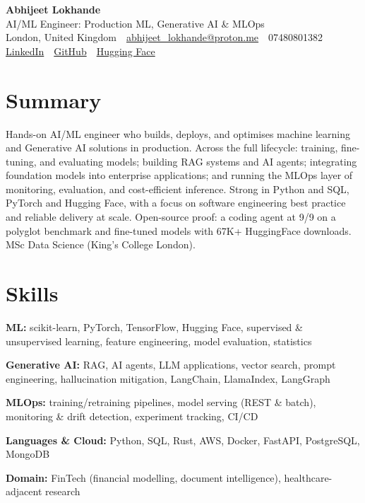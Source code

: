 \documentclass[10pt,a4paper]{article}
\newcommand{\sep}{\,\textcolor{accent!60}{\textbar}\,}
\begin{document}
\begin{center}
  {\fontsize{24}{26}\selectfont\bfseries Abhijeet Lokhande}\\[3pt]
  {\color{accent}\large AI/ML Engineer: Production ML, Generative AI \& MLOps}\\[5pt]
  {\small
    London, United Kingdom \sep
    \href{mailto:abhijeet_lokhande@proton.me}{abhijeet\_lokhande@proton.me} \sep
    07480801382 \\[2pt]
    \href{https://www.linkedin.com/in/ablds/}{LinkedIn} \sep
    \href{https://github.com/abhijeetscode}{GitHub} \sep
    \href{https://huggingface.co/ab-ai}{Hugging Face}
  }
\end{center}
\vspace{2pt}

\section{Summary}
Hands-on AI/ML engineer who builds, deploys, and optimises machine learning and Generative AI solutions in production. Across the full lifecycle: training, fine-tuning, and evaluating models; building RAG systems and AI agents; integrating foundation models into enterprise applications; and running the MLOps layer of monitoring, evaluation, and cost-efficient inference. Strong in Python and SQL, PyTorch and Hugging Face, with a focus on software engineering best practice and reliable delivery at scale. Open-source proof: a coding agent at 9/9 on a polyglot benchmark and fine-tuned models with 67K+ HuggingFace downloads. MSc Data Science (King's College London).

\section{Skills}
\begin{tight}
  \item[\textcolor{accent}{\small$\bullet$}] \textbf{ML:} scikit-learn, PyTorch, TensorFlow, Hugging Face, supervised \& unsupervised learning, feature engineering, model evaluation, statistics
  \item[\textcolor{accent}{\small$\bullet$}] \textbf{Generative AI:} RAG, AI agents, LLM applications, vector search, prompt engineering, hallucination mitigation, LangChain, LlamaIndex, LangGraph
  \item[\textcolor{accent}{\small$\bullet$}] \textbf{MLOps:} training/retraining pipelines, model serving (REST \& batch), monitoring \& drift detection, experiment tracking, CI/CD
  \item[\textcolor{accent}{\small$\bullet$}] \textbf{Languages \& Cloud:} Python, SQL, Rust, AWS, Docker, FastAPI, PostgreSQL, MongoDB
  \item[\textcolor{accent}{\small$\bullet$}] \textbf{Domain:} FinTech (financial modelling, document intelligence), healthcare-adjacent research
\end{tight}
\end{document}
